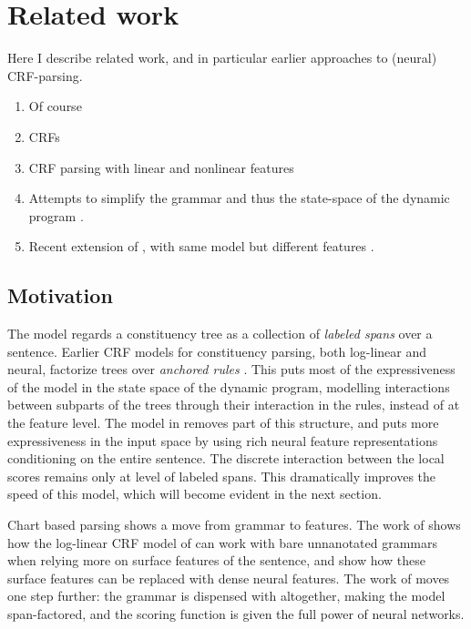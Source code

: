 \section{Related work}
Here I describe related work, and in particular earlier approaches to (neural) CRF-parsing.
\begin{enumerate}
  \item Of course \citep{stern2017minimal}
  \item CRFs \citep{sutton2012crf}
  \item CRF parsing with linear and nonlinear features \citep{finkel2008crf,klein2015crf}
  \item Attempts to simplify the grammar and thus the state-space of the dynamic program \citep{hall2014less}.
  \item Recent extension of \citet{stern2017minimal}, with same model but different features \citep{kitaev2018attentive}.
\end{enumerate}

\subsection{Motivation}
The model regards a constituency tree as a collection of \textit{labeled spans} over a sentence. Earlier CRF models for constituency parsing, both log-linear and neural, factorize trees over \textit{anchored rules} \citep{finkel2008crf,klein2015crf}. This puts most of the expressiveness of the model in the state space of the dynamic program, modelling interactions between subparts of the trees through their interaction in the rules, instead of at the feature level. The model in \citet{stern2017minimal} removes part of this structure, and puts more expressiveness in the input space by using rich neural feature representations conditioning on the entire sentence. The discrete interaction between the local scores remains only at level of labeled spans. This dramatically improves the speed of this model, which will become evident in the next section.

Chart based parsing shows a move from grammar to features. The work of \citet{hall2014less} shows how the log-linear CRF model of \cite{finkel2008crf} can work with bare unnanotated grammars when relying more on surface features of the sentence, and \citet{klein2015crf} show how these surface features can be replaced with dense neural features. The work of \citep{stern2017minimal} moves one step further: the grammar is dispensed with altogether, making the model span-factored, and the scoring function is given the full power of neural networks.


